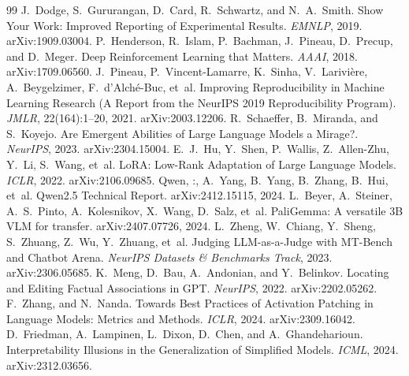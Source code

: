 \begin{thebibliography}{99}
 J.~Dodge, S.~Gururangan, D.~Card, R.~Schwartz, and N.~A.~Smith. Show Your Work: Improved Reporting of Experimental Results. \emph{EMNLP}, 2019. arXiv:1909.03004.
 P.~Henderson, R.~Islam, P.~Bachman, J.~Pineau, D.~Precup, and D.~Meger. Deep Reinforcement Learning that Matters. \emph{AAAI}, 2018. arXiv:1709.06560.
 J.~Pineau, P.~Vincent-Lamarre, K.~Sinha, V.~Larivière, A.~Beygelzimer, F.~d'Alché-Buc, et~al. Improving Reproducibility in Machine Learning Research (A Report from the NeurIPS 2019 Reproducibility Program). \emph{JMLR}, 22(164):1--20, 2021. arXiv:2003.12206.
 R.~Schaeffer, B.~Miranda, and S.~Koyejo. Are Emergent Abilities of Large Language Models a Mirage?. \emph{NeurIPS}, 2023. arXiv:2304.15004.
 E.~J.~Hu, Y.~Shen, P.~Wallis, Z.~Allen-Zhu, Y.~Li, S.~Wang, et~al. LoRA: Low-Rank Adaptation of Large Language Models. \emph{ICLR}, 2022. arXiv:2106.09685.
 Qwen, :, A.~Yang, B.~Yang, B.~Zhang, B.~Hui, et~al. Qwen2.5 Technical Report. arXiv:2412.15115, 2024.
 L.~Beyer, A.~Steiner, A.~S.~Pinto, A.~Kolesnikov, X.~Wang, D.~Salz, et~al. PaliGemma: A versatile 3B VLM for transfer. arXiv:2407.07726, 2024.
 L.~Zheng, W.~Chiang, Y.~Sheng, S.~Zhuang, Z.~Wu, Y.~Zhuang, et~al. Judging LLM-as-a-Judge with MT-Bench and Chatbot Arena. \emph{NeurIPS Datasets \& Benchmarks Track}, 2023. arXiv:2306.05685.
 K.~Meng, D.~Bau, A.~Andonian, and Y.~Belinkov. Locating and Editing Factual Associations in GPT. \emph{NeurIPS}, 2022. arXiv:2202.05262.
 F.~Zhang, and N.~Nanda. Towards Best Practices of Activation Patching in Language Models: Metrics and Methods. \emph{ICLR}, 2024. arXiv:2309.16042.
 D.~Friedman, A.~Lampinen, L.~Dixon, D.~Chen, and A.~Ghandeharioun. Interpretability Illusions in the Generalization of Simplified Models. \emph{ICML}, 2024. arXiv:2312.03656.
\end{thebibliography}
